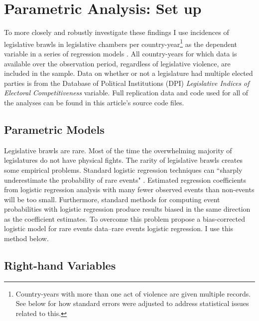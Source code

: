 \documentclass[a4paper]{article}\usepackage[]{graphicx}\usepackage[]{color}
\begin{document}
\section{Parametric Analysis: Set up}

To more closely and robustly investigate these findings I use incidences of legislative brawls in  legislative chambers per country-year\footnote{Country-years with more than one act of violence are given multiple records. See below for how standard errors were adjusted to address statistical issues related to this.} as the dependent variable in a series of regression models \citep{KingRareEvents2001, KingRareEventsPA2001}. All country-years for which data is available over the observation period, regardless of legislative violence, are included in the sample. Data on whether or not a legislature had multiple elected parties is from the Database of Political Institutions (DPI) \citep[updated to 2010]{DPI2001} {\emph{Legislative Indices of Electoral Competitiveness}} variable. Full replication data and code used for all of the analyses can be found in this article's source code files.

\subsection{Parametric Models}

Legislative brawls are rare. Most of the time the overwhelming majority of legislatures do not have physical fights. The rarity of legislative brawls creates some empirical problems. Standard logistic regression techniques can ``sharply underestimate the probability of rare events" \cite[137]{KingRareEventsPA2001}. Estimated regression coefficients from logistic regression analysis with many fewer observed events than non-events will be too small. Furthermore, standard methods for computing event probabilities with logistic regression produce results biased in the same direction as the coefficient estimates. To overcome this problem \cite{KingRareEvents2001,KingRareEventsPA2001} propose a bias-corrected logistic model for rare events data--rare events logistic regression. I use this method below.

\subsection{Right-hand Variables}
\end{document}
